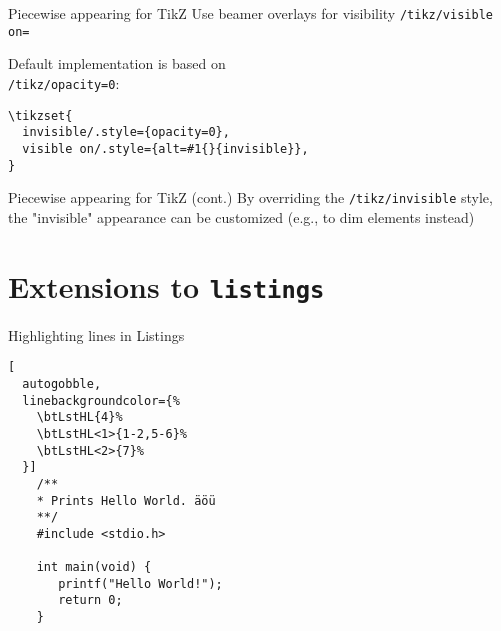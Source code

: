 \documentclass{beamer}
\def\tikzkey#1{{\color{black!50}\texttt{/tikz/#1}}}
\begin{document}
\begin{frame}[fragile]{Piecewise appearing for TikZ}
\bi
\ii Use beamer overlays for visibility \tikzkey{visible on=}
\par
\begin{LTXexample}
\end{LTXexample}
 Default implementation is based on \\
  \tikzkey{opacity=0}:
\begin{lstlisting}
\tikzset{
  invisible/.style={opacity=0},
  visible on/.style={alt=#1{}{invisible}},
}
\end{lstlisting}
\ei
{}
\end{frame}

\begin{frame}[fragile]{Piecewise appearing for TikZ (cont.) }
\bi
\ii By overriding the \tikzkey{invisible} style, the "invisible" appearance can be customized (e.g., to dim elements instead) 
\par
\begin{LTXexample}
\end{LTXexample}
\ei
\end{frame}


\section{Extensions to \texttt{listings}}

\begin{frame}[fragile]{Highlighting lines in Listings}
\begin{LTXexample}[pos=r]
\lstset{language=C, numbers=left}
\begin{lstlisting}[
  autogobble,
  linebackgroundcolor={%
    \btLstHL{4}%
    \btLstHL<1>{1-2,5-6}%
    \btLstHL<2>{7}%
  }]
    /**
    * Prints Hello World. äöü
    **/
    #include <stdio.h>

    int main(void) {
       printf("Hello World!");  
       return 0;
    }
\end{lstlisting}
\end{LTXexample}


\end{frame}
\end{document}
